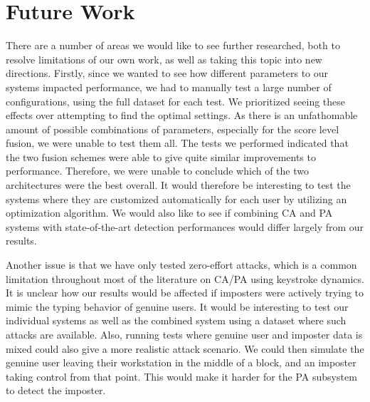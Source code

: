 


\section{Future Work}
\label{sec:future}
There are a number of areas we would like to see further researched, both to resolve limitations of our own work, as well as taking this topic into new directions.
Firstly, since we wanted to see how different parameters to our systems impacted performance, we had to manually test a large number of configurations, using the full dataset for each test.
We prioritized seeing these effects over attempting to find the optimal settings.
As there is an unfathomable amount of possible combinations of parameters, especially for the score level fusion, we were unable to test them all.
The tests we performed indicated that the two fusion schemes were able to give quite similar improvements to performance.
Therefore, we were unable to conclude which of the two architectures were the best overall.
It would therefore be interesting to test the systems where they are customized automatically for each user by utilizing an optimization algorithm.
We would also like to see if combining CA and PA systems with state-of-the-art detection performances would differ largely from our results.

Another issue is that we have only tested zero-effort attacks, which is a common limitation throughout most of the literature on CA/PA using keystroke dynamics.
It is unclear how our results would be affected if imposters were actively trying to mimic the typing behavior of genuine users.
It would be interesting to test our individual systems as well as the combined system using a dataset where such attacks are available.
Also, running tests where genuine user and imposter data is mixed could also give a more realistic attack scenario.
We could then simulate the genuine user leaving their workstation in the middle of a block, and an imposter taking control from that point.
This would make it harder for the PA subsystem to detect the imposter.


